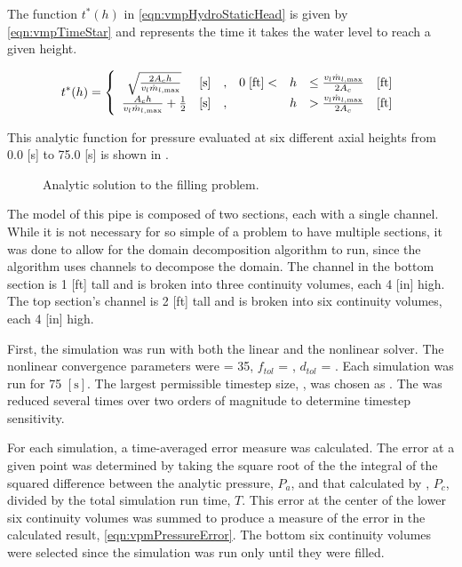 The function $t^{*}(h)$ in \eqref{eqn:vmpHydroStaticHead} is given by \eqref{eqn:vmpTimeStar} and represents the time it takes the water level to reach a given height.

\begin{equation}
\label{eqn:vmpTimeStar}
t^{*}(h)= 
 \left\{
\begin{array}{cclrcll}
\sqrt{\frac{2 A_c h}{v_{l} \dot{m}_{l,\text{max}}}} & [ \text{s} ] & , & 0\; [ \text{ft}] < & h & \leq \frac{v_l \dot{m}_{l,\text{max}}}{2 A_c} & [\text{ft}] \\
\frac{ A_c h }{v_{l} \dot{m}_{l,\text{max}}} + \onehalf & [ \text{s} ] & , &                & h & > \frac{v_l \dot{m}_{l,\text{max}}}{2 A_c} & [\text{ft}]
\end{array}\right.
\end{equation}

This analytic function for pressure evaluated at six different axial heights from 0.0 [s] to 75.0 [s] is shown in .

\begin{figure}[h!tb]
\centering

\caption{Analytic solution to the filling problem.}
\label{fig:vmpAnalyticSol}
\end{figure}

The \cobra{} model of this pipe is composed of two sections, each with a single channel.
While it is not necessary for so simple of a problem to have multiple sections, it was done to allow for the domain decomposition algorithm to run, since the algorithm uses channels to decompose the domain.
The channel in the bottom section is 1 [ft] tall and is broken into three continuity volumes, each 4 [in] high.
The top section's channel is 2 [ft] tall and is broken into six continuity volumes, each 4 [in] high.

First, the simulation was run with both the linear and the nonlinear solver.
The nonlinear convergence parameters were \kmax{} = 35, $f_{tol}$ = , $d_{tol}$ = . 
Each simulation was run for 75 $[ \text{s} ]$.
The largest permissible timestep size, \dtmax{}, was chosen as .
The \dtmax{} was reduced several times over two orders of magnitude to determine timestep sensitivity.

For each simulation, a time-averaged error measure was calculated.
The error at a given point was determined by taking the square root of the the integral of the squared difference between the analytic pressure, $P_{a}$, and that calculated by \cobra{}, $P_{c}$, divided by the total simulation run time, $T$.
This error at the center of the lower six continuity volumes was summed to produce a measure of the error in the calculated result, \eqref{eqn:vpmPressureError}.
The bottom six continuity volumes were selected since the simulation was run only until they were filled.

